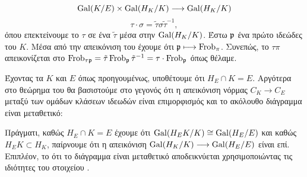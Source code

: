$$\operatorname{Gal}(K/E) \times \operatorname{Gal}(H_K/K) \longrightarrow \operatorname{Gal}(H_K/K)$$
$$ \tau \cdot \sigma = \tilde{\tau} \sigma \tilde{\tau}^{-1},$$ όπου επεκτείνουμε το $\tau$ σε ένα $\tilde{\tau}$ μέσα στην 
$\operatorname{Gal}(H_K/K)$. Έστω $\mathfrak{p}$ ένα πρώτο ιδεώδες του $K$. Μέσα από την απεικόνιση του  έχουμε ότι $\mathfrak{p} \longmapsto 
\operatorname{Frob}_\pi$. Συνεπώς, το $\tau \pi$ απεικονίζεται στο $\operatorname{Frob}_{\tau \mathfrak{p}} = 
\tilde{\tau}\operatorname{Frob}_{\mathfrak{p}} \tilde{\tau}^{-1} = \tau \cdot \operatorname{Frob}_{\mathfrak{p}}$ όπως θέλαμε.

\noindent Έχοντας τα $K$ και $E$ όπως προηγουμένως, υποθέτουμε ότι $H_E \cap K = E$. Αργότερα στο θεώρημα του  θα 
βασιστούμε στο γεγονός ότι η απεικόνιση νόρμας $C_K \longrightarrow C_E$ μεταξύ των ομάδων κλάσεων ιδεωδών είναι επιμορφισμός 
και το ακόλουθο διάγραμμα είναι μεταθετικό:

\begin{figure}[H]
    \centering
\end{figure}

\noindent Πράγματι, καθώς $H_E\cap K =E$ έχουμε ότι $\operatorname{Gal}(H_EK/K) \cong \operatorname{Gal}(H_E/E)$ και καθώς $H_EK\subset H_K$, 
παίρνουμε ότι η απεικόνιση $\operatorname{Gal}(H_K/K) \longrightarrow \operatorname{Gal}(H_E/E)$ είναι επί. Επιπλέον, το ότι το διάγραμμα είναι 
μεταθετικό αποδεικνύεται χρησιμοποιώντας τις ιδιότητες του στοιχείου .